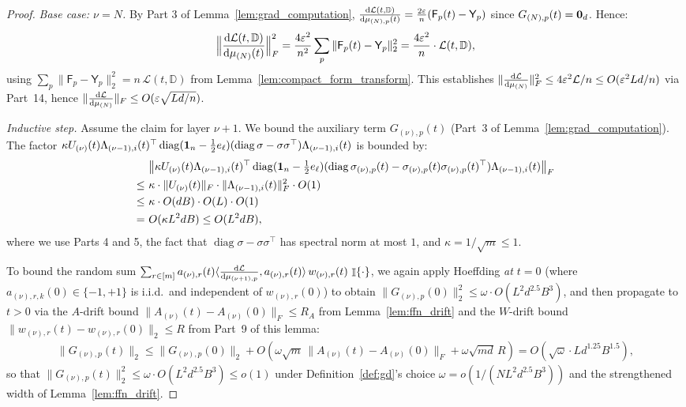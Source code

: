 \documentclass[11pt]{article}
\theoremstyle{plain}
\renewcommand{\d}{\mathrm{d}}
\DeclareMathOperator{\I}{\mathbb{I}}
\DeclareMathOperator{\diag}{diag}
\begin{document}
\begin{proof}
    {\it Base case: $\nu = N$.} By Part 3 of Lemma~\ref{lem:grad_computation}, $\frac{\d{\cal L}(t,\mathbb{D})}{\d \mu_{(N), p}(t)} = \frac{2\varepsilon}{n}({\sf F}_p(t)-{\sf Y}_p)$ since $G_{(N),p}(t) = {\bf 0}_d$. Hence:
    \begin{align*}
        \Big\|\frac{\d{\cal L}(t,\mathbb{D})}{\d \mu_{(N)}(t)}\Big\|_F^2
        = \frac{4\varepsilon^2}{n^2}\sum_p \|{\sf F}_p(t)-{\sf Y}_p\|_2^2
        = \frac{4\varepsilon^2}{n}\cdot {\cal L}(t,\mathbb{D}),
    \end{align*}
    using $\sum_p \|\mathsf{F}_p-\mathsf{Y}_p\|_2^2 = n\,\mathcal{L}(t,\mathbb{D})$ from Lemma~\ref{lem:compact_form_transform}. This establishes $\|\frac{\d{\cal L}}{\d\mu_{(N)}}\|_F^2 \le 4\varepsilon^2 \mathcal{L}/n \le O(\varepsilon^2 Ld/n)$ via Part~14, hence $\|\frac{\d{\cal L}}{\d\mu_{(N)}}\|_F \le O(\varepsilon\sqrt{Ld/n})$.

    {\it Inductive step.} Assume the claim for layer $\nu+1$. We bound the auxiliary term $G_{(\nu),p}(t)$ (Part~3 of Lemma~\ref{lem:grad_computation}). The factor $\kappa U_{(\nu)}(t) \Lambda_{(\nu-1),i}(t)^\top \diag({\bf 1}_n - \frac{1}{2}e_\ell) (\diag\sigma - \sigma\sigma^\top)\Lambda_{(\nu-1),i}(t)$ is bounded by:
    \begin{align*}
        & ~ \big\| \kappa U_{(\nu)}(t)\Lambda_{(\nu-1), i }(t)^\top \diag({\bf 1}_n - \tfrac{1}{2}e_\ell) (\diag\sigma_{(\nu), p}(t) - \sigma_{(\nu), p}(t)\sigma_{(\nu), p}(t)^\top)\Lambda_{(\nu-1), i }(t) \big\|_F \\
        \leq & ~ \kappa \cdot \|U_{(\nu)}(t)\|_F \cdot \|\Lambda_{(\nu-1),i}(t)\|_F^2 \cdot O(1) \\
        \leq & ~ \kappa \cdot O(dB) \cdot O(L) \cdot O(1) \\
        = & ~ O(\kappa L^2dB) \leq O(L^2dB),
    \end{align*}
    where we use Parts 4 and 5, the fact that $\diag\sigma - \sigma\sigma^\top$ has spectral norm at most $1$, and $\kappa = 1/\sqrt{m} \leq 1$.

    To bound the random sum $\sum_{r\in[m]} a_{(\nu),r}(t)\langle\frac{\d{\cal L}}{\d\mu_{(\nu+1),p}}, a_{(\nu),r}(t)\rangle\, w_{(\nu),r}(t)\,\I\{\cdot\}$, we again apply Hoeffding {\it at $t=0$} (where $a_{(\nu),r,k}(0)\in\{-1,+1\}$ is i.i.d.\ and independent of $w_{(\nu),r}(0)$) to obtain $\|G_{(\nu),p}(0)\|_2^2 \le \omega\cdot O(L^2 d^{2.5} B^3)$, and then propagate to $t>0$ via the $A$-drift bound $\|A_{(\nu)}(t)-A_{(\nu)}(0)\|_F \le R_A$ from Lemma~\ref{lem:ffn_drift} and the $W$-drift bound $\|w_{(\nu),r}(t)-w_{(\nu),r}(0)\|_2 \le R$ from Part~9 of this lemma:
    \begin{align*}
        \|G_{(\nu),p}(t)\|_2 \le \|G_{(\nu),p}(0)\|_2 + O(\omega\sqrt{m}\,\|A_{(\nu)}(t)-A_{(\nu)}(0)\|_F + \omega\sqrt{m d}\,R) = O(\sqrt\omega \cdot Ld^{1.25}B^{1.5}),
    \end{align*}
    so that $\|G_{(\nu),p}(t)\|_2^2 \le \omega\cdot O(L^2 d^{2.5}B^3) \le o(1)$ under Definition~\ref{def:gd}'s choice $\omega = o(1/(NL^2 d^{2.5}B^3))$ and the strengthened width of Lemma~\ref{lem:ffn_drift}.


\end{proof}
\end{document}
